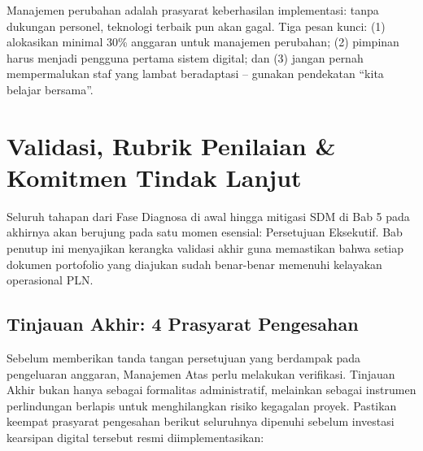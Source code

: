 \documentclass[12pt,a4paper]{report}
\begin{document}
\begin{plnbox}
Manajemen perubahan adalah prasyarat keberhasilan implementasi: tanpa dukungan personel, teknologi terbaik pun akan gagal. Tiga pesan kunci: (1) alokasikan minimal 30\% anggaran untuk manajemen perubahan; (2) pimpinan harus menjadi pengguna pertama sistem digital; dan (3) jangan pernah mempermalukan staf yang lambat beradaptasi -- gunakan pendekatan ``kita belajar bersama''.
\end{plnbox}


\chapter{Validasi, Rubrik Penilaian \& Komitmen Tindak Lanjut}

Seluruh tahapan dari Fase Diagnosa di awal hingga mitigasi SDM di Bab 5 pada akhirnya akan berujung pada satu momen esensial: Persetujuan Eksekutif. Bab penutup ini menyajikan kerangka validasi akhir guna memastikan bahwa setiap dokumen portofolio yang diajukan sudah benar-benar memenuhi kelayakan operasional PLN.


\section{Tinjauan Akhir: 4 Prasyarat Pengesahan}

Sebelum memberikan tanda tangan persetujuan yang berdampak pada pengeluaran anggaran, Manajemen Atas perlu melakukan verifikasi. Tinjauan Akhir  bukan hanya sebagai formalitas administratif, melainkan sebagai instrumen perlindungan berlapis untuk menghilangkan risiko kegagalan proyek. Pastikan keempat prasyarat pengesahan berikut seluruhnya dipenuhi sebelum investasi kearsipan digital tersebut resmi diimplementasikan:
\end{document}
